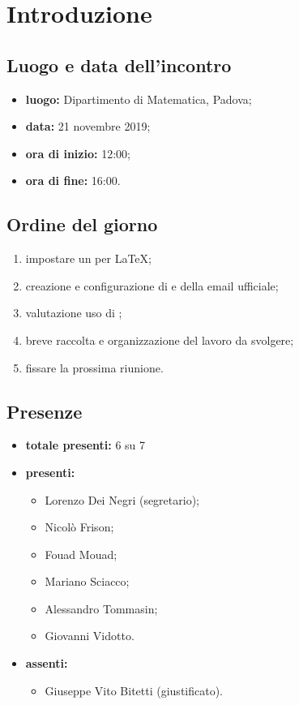 \section*{Introduzione}

\subsection*{Luogo e data dell'incontro}
	\begin{itemize}
		\item \textbf{luogo:} Dipartimento di Matematica, Padova;
		\item \textbf{data:} 21 novembre 2019;
		\item \textbf{ora di inizio:} 12:00;
		\item \textbf{ora di fine:} 16:00.
	\end{itemize}

\subsection*{Ordine del giorno}
	\begin{enumerate}

		\item impostare un  per \LaTeX{};
		\item creazione e configurazione di  e della email ufficiale;
		\item valutazione uso di ;
		\item breve raccolta e organizzazione del lavoro da svolgere;
		\item fissare la prossima riunione.

	\end{enumerate}

\subsection*{Presenze}
	\begin{itemize}
		\item \textbf{totale presenti:} 6 su 7
		\item \textbf{presenti: }

			\begin{itemize}			
				\item Lorenzo Dei Negri (segretario);
				\item Nicolò Frison;
				\item Fouad Mouad;
				\item Mariano Sciacco;
				\item Alessandro Tommasin;
				\item Giovanni Vidotto.
			\end{itemize}

		\item \textbf{assenti: } 
			\begin{itemize}	
				\item Giuseppe Vito Bitetti (giustificato).
			\end{itemize}
	\end{itemize}


